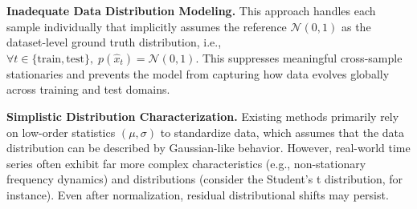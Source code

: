 \documentclass[sigconf,anonymous,review]{acmart}
\begin{document}
\noindent{}\textbf{
Inadequate Data Distribution Modeling.
}
This approach handles each sample individually that implicitly assumes the reference $\mathcal{N}(0,1)$ as the dataset-level ground truth distribution, i.e., $\forall t \in \{\text{train}, \text{test}\}, \; p(\hat{x}_t) = \mathcal{N}(0, 1)$.
This suppresses meaningful cross-sample stationaries and prevents the model from capturing how data evolves globally across training and test domains.

\noindent{}\textbf{
Simplistic Distribution Characterization.
}
Existing methods primarily rely on low-order statistics $(\mu, \sigma)$ to standardize data, which assumes that the data distribution can be described by Gaussian-like behavior.
However, real-world time series often exhibit far more complex characteristics (e.g., non-stationary frequency dynamics) and distributions (consider the Student's t distribution, for instance).
Even after normalization, residual distributional shifts may persist.










\end{document}
